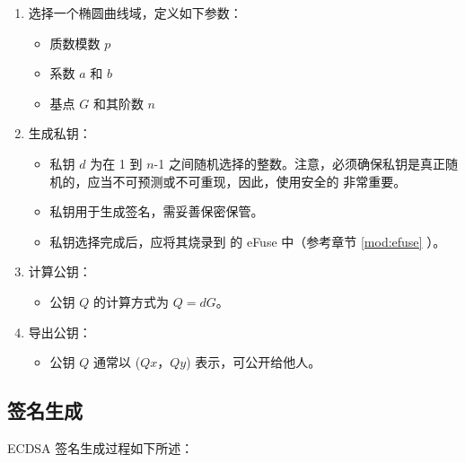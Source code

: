\documentclass[main\_\_CN.tex]{subfiles}
\begin{document}
\begin{enumerate}
    \item 选择一个椭圆曲线域，定义如下参数：
    \begin{itemize}
        \item 质数模数 $p$
        \item 系数 $a$ 和 $b$
        \item 基点 $G$ 和其阶数 $n$
    \end{itemize}
    \item 生成私钥：
    \begin{itemize}
        \item 私钥 $d$ 为在 1 到 $n$-1 之间随机选择的整数。注意，必须确保私钥是真正随机的，应当不可预测或不可重现，因此，使用安全的  非常重要。
        \item 私钥用于生成签名，需妥善保密保管。
        \item 私钥选择完成后，应将其烧录到 \chipname{} 的 eFuse 中（参考章节 \ref{mod:efuse} \textit{}）。
    \end{itemize}
    \item 计算公钥：
    \begin{itemize}
        \item 公钥 $Q$ 的计算方式为 $Q = dG$。
    \end{itemize}
    \item 导出公钥：
    \begin{itemize}
        \item 公钥 $Q$ 通常以 ($Qx$，$Qy$) 表示，可公开给他人。
    \end{itemize}
\end{enumerate}

\subsection{签名生成}

ECDSA 签名生成过程如下所述：
\end{document}
